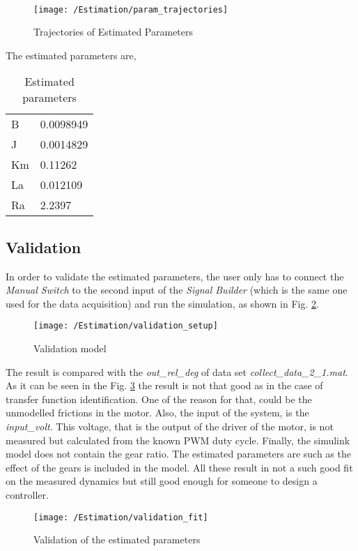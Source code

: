 \


\begin{figure}[H]
	\texttt{[image: /Estimation/param\_trajectories]}
	\caption{Trajectories of Estimated Parameters}
	\label{Fig:param_trajectories}
\end{figure}


The estimated parameters are,

\begin{table}[H]
	\begin{tabular}{|l l|}
	\hline 
	B & 0.0098949 \\
	J & 0.0014829 \\
	Km & 0.11262 \\
	La & 0.012109 \\
	Ra & 2.2397 \\
	\hline
	\end{tabular}
	\caption{Estimated parameters}
	\label{Tab:est_param} 
\end{table}




\subsection{Validation}

In order to validate the estimated parameters, the user only has to connect the \textit{Manual Switch} to the second input of the \textit{Signal Builder} (which is the same one used for the data acquisition) and run the simulation, as shown in Fig. \ref{Fig:validation}.

\begin{figure}[H]
	\texttt{[image: /Estimation/validation\_setup]}
	\caption{Validation model}
	\label{Fig:validation}
\end{figure}

The result is compared with the \textit{out\_rel\_deg} of data set \textit{collect\_data\_2\_1.mat}. As it can be seen in the Fig. \ref{Fig:validation_fit} the result is not that good as in the case of transfer function identification. One of the reason for that, could be the unmodelled frictions in the motor. Also, the input of the system, is the \textit{input\_volt}. This voltage, that is the output of the driver of the motor, is not measured but calculated from the known PWM duty cycle. Finally, the simulink model does not contain the gear ratio. The estimated parameters are such as the effect of the gears is included in the model. All these result in not a such good fit on the measured dynamics but still good enough for someone to design a controller.

\begin{figure}[H]
	\texttt{[image: /Estimation/validation\_fit]}
	\caption{Validation of the estimated parameters}
	\label{Fig:validation_fit}
\end{figure}